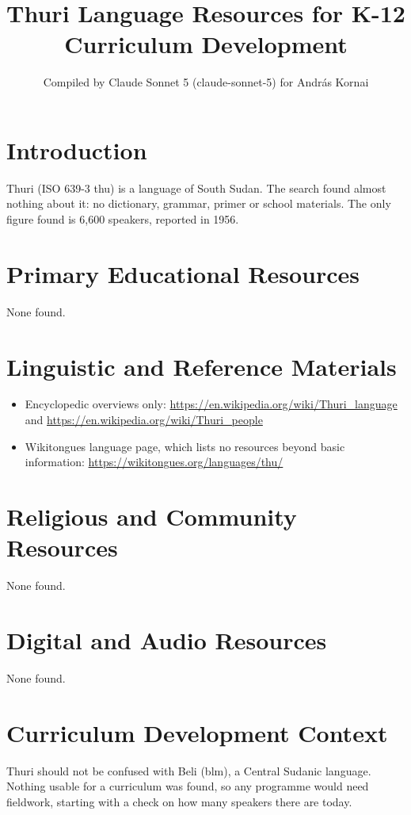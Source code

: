 \documentclass[12pt]{article}
\title{Thuri Language Resources for K-12 Curriculum Development}
\author{Compiled by Claude Sonnet 5 (claude-sonnet-5) for Andr\'as Kornai}
\date{}
\begin{document}
\maketitle

\section{Introduction}
Thuri (ISO 639-3 thu) is a language of South Sudan. The search found almost nothing about it: no dictionary, grammar, primer or school materials. The only figure found is 6,600 speakers, reported in 1956.

\section{Primary Educational Resources}
None found.

\section{Linguistic and Reference Materials}
\begin{itemize}
\item Encyclopedic overviews only: \url{https://en.wikipedia.org/wiki/Thuri_language} and \url{https://en.wikipedia.org/wiki/Thuri_people}
\item Wikitongues language page, which lists no resources beyond basic information: \url{https://wikitongues.org/languages/thu/}
\end{itemize}

\section{Religious and Community Resources}
None found.

\section{Digital and Audio Resources}
None found.

\section{Curriculum Development Context}
Thuri should not be confused with Beli (blm), a Central Sudanic language. Nothing usable for a curriculum was found, so any programme would need fieldwork, starting with a check on how many speakers there are today.
\end{document}
